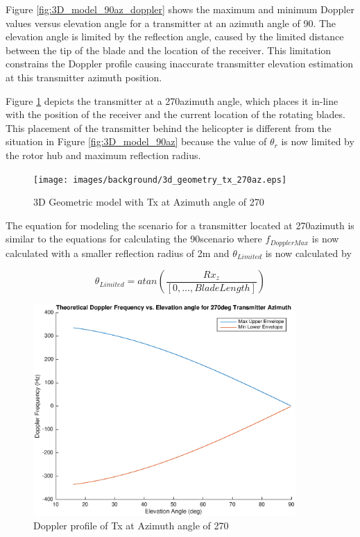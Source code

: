 Figure \ref{fig:3D_model_90az_doppler} shows the maximum and minimum Doppler values versus elevation angle for a transmitter at an azimuth angle of 90\textdegree. The elevation angle is limited by the reflection angle, caused by the limited distance between the tip of the blade and the location of the receiver. This limitation constrains the Doppler profile causing inaccurate transmitter elevation estimation at this transmitter azimuth position.

Figure \ref{fig:3D_model_270az} depicts the transmitter at a 270\textdegree \space azimuth angle, which places it in-line with the position of the receiver and the current location of the rotating blades. This placement of the transmitter behind the helicopter is different from the situation in Figure \ref{fig:3D_model_90az} because the value of $\theta_r$ is now limited by the  rotor hub and maximum reflection radius.

\begin{figure}
	\begin{center}
		\texttt{[image: images/background/3d\_geometry\_tx\_270az.eps]}
		\caption{3D Geometric model with Tx at Azimuth angle of 270\textdegree}
		\label{fig:3D_model_270az}
	\end{center}
\end{figure}

The equation for modeling the scenario for a transmitter located at 270\textdegree \space azimuth is similar to the equations for calculating the 90\textdegree \space scenario where $f_{DopplerMax}$ is now calculated with a smaller reflection radius of 2m and $\theta_{Limited}$ is now calculated by

\begin{equation}
	\theta_{Limited} = atan\left(\frac{Rx_z}{[0, \dots, BladeLength]}\right)
	\label{eq:theory_270_limited}
\end{equation}

\begin{figure}
	\begin{center}
		\includegraphics[width=10cm]{images/background/3d_geometry_tx_270az_doppler_profile.eps}
		\caption{Doppler profile of Tx at Azimuth angle of 270\textdegree}
		\label{fig:3D_model_270az_doppler}
	\end{center}
\end{figure}

